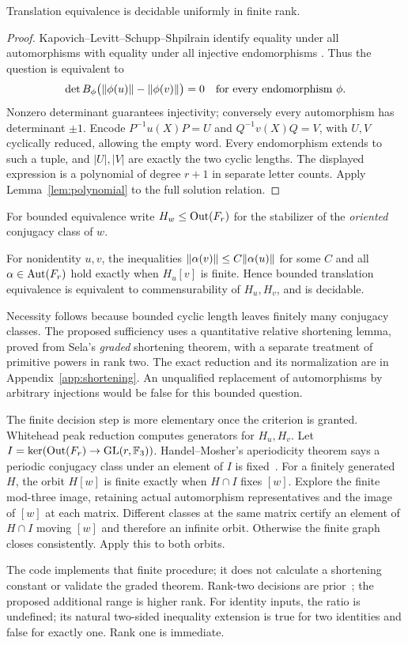 \begin{theorem}\label{prop:translation}
Translation equivalence is decidable uniformly in finite rank.
\end{theorem}
\begin{proof}
Kapovich--Levitt--Schupp--Shpilrain identify equality under all
automorphisms with equality under all injective endomorphisms
\cite[Corollary 1.4]{klss}. Thus the question is equivalent to
\[
 \det B_\phi\bigl(\lVert \phi(u)\rVert-\lVert \phi(v)\rVert\bigr)=0
 \quad\hbox{for every endomorphism }\phi.
\]
Nonzero determinant guarantees injectivity; conversely every
automorphism has determinant $\pm1$. Encode
$P^{-1}u(X)P=U$ and $Q^{-1}v(X)Q=V$, with $U,V$ cyclically
reduced, allowing the empty word. Every endomorphism extends to such
a tuple, and $|U|,|V|$ are exactly the two cyclic lengths. The displayed
expression is a polynomial of degree $r+1$ in separate letter counts.
Apply Lemma~\ref{lem:polynomial} to the full solution relation.
\end{proof}

For bounded equivalence write $H_w\le\operatorname{Out}(F_r)$ for the stabilizer
of the \emph{oriented} conjugacy class of $w$.

\begin{theorem}\label{prop:bounded}
For nonidentity $u,v$, the inequalities
$\lVert \alpha(v)\rVert\le C\lVert \alpha(u)\rVert$ for some $C$ and all
$\alpha\in\operatorname{Aut}(F_r)$ hold exactly when $H_u[v]$ is finite.
Hence bounded translation equivalence is equivalent to commensurability
of $H_u,H_v$, and is decidable.
\end{theorem}

Necessity follows because bounded cyclic length leaves finitely many
conjugacy classes. The proposed sufficiency uses a quantitative relative
shortening lemma, proved from Sela's \emph{graded} shortening theorem,
with a separate treatment of primitive powers in rank two. The exact
reduction and its normalization are in Appendix~\ref{app:shortening}.
An unqualified replacement of automorphisms by arbitrary injections
would be false for this bounded question.

The finite decision step is more elementary once the criterion is
granted. Whitehead peak reduction computes generators for $H_u,H_v$.
Let $I=\ker(\operatorname{Out}(F_r)\to\operatorname{GL}(r,\mathbb F_3))$. Handel--Mosher's
aperiodicity theorem says a periodic conjugacy class under an element
of $I$ is fixed~\cite[Theorem 4.1]{handel-mosher}. For a finitely
generated $H$, the orbit $H[w]$ is finite exactly when $H\cap I$
fixes $[w]$. Explore the finite mod-three image, retaining actual
automorphism representatives and the image of $[w]$ at each matrix.
Different classes at the same matrix certify an element of $H\cap I$
moving $[w]$ and therefore an infinite orbit. Otherwise the finite
graph closes consistently. Apply this to both orbits.

The code implements that finite procedure; it does not calculate a
shortening constant or validate the graded theorem. Rank-two decisions
are prior~\cite{lee,lee-translation}; the proposed additional range is higher rank.
For identity inputs, the ratio is undefined; its natural two-sided
inequality extension is true for two identities and false for exactly
one. Rank one is immediate.

